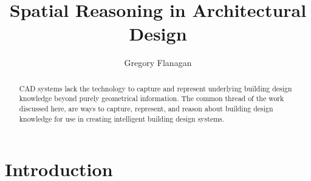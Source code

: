 \documentclass[12pt]{ucthesis}
\begin{document}

\title{Spatial Reasoning in Architectural Design}
\author{Gregory Flanagan}
  
 
     



\maketitle

\begin{frontmatter}

\copyrightpage

\committeemembershippage

\begin{abstract}
CAD systems lack the technology to capture and represent underlying building design
knowledge beyond purely geometrical information. The common thread of the work
 discussed here, are ways to capture, represent, and reason about building design
knowledge for use in creating intelligent building design systems.  



\end{abstract}





\tableofcontents


\listoftables

\listoffigures

\end{frontmatter}

\pagestyle{plain}




\renewcommand{\baselinestretch}{1.66}







\chapter{Introduction}
\label{intro}
\end{document}
